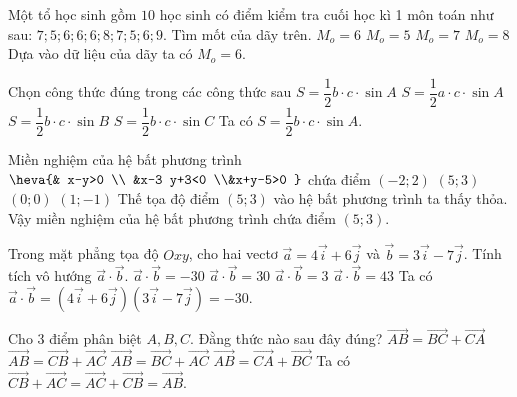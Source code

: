 \begin{ex}%
    Một tổ học sinh gồm $10$ học sinh có điểm kiểm tra cuối học kì 1 môn toán như sau: $7 ; 5 ; 6 ; 6 ; 6 ; 8 ; 7 ; 5 ; 6 ; 9$. Tìm mốt của dãy trên.
    \choice
     {\True $M_o=6$}
    {$M_o=5$}
    {$M_o=7$}
    {$M_o=8$}
    \loigiai
    {
        Dựa vào dữ liệu của dãy ta có $M_o=6$.
    }
\end{ex}

\begin{ex}%
    Chọn công thức đúng trong các công thức sau
    \choice
    {\True $S=\dfrac{1}{2}b\cdot c \cdot\sin A$}
    {$S=\dfrac{1}{2} a\cdot c \cdot\sin A$}
    {$S=\dfrac{1}{2} b\cdot c\cdot \sin B$}
    {$S=\dfrac{1}{2} b \cdot c \cdot \sin C$}
    \loigiai
    {
        Ta có $S=\dfrac{1}{2}b\cdot c \cdot\sin A$.
    }
\end{ex}
 
\begin{ex}%
    Miền nghiệm của hệ bất phương trình $\heva{& x-y>0  \\ &x-3 y+3<0 \\&x+y-5>0 }$ chứa điểm
    \choice
   {$(-2 ; 2)$}
  {\True $(5 ; 3)$}
 {$(0 ; 0)$}
  {$(1 ;-1)$}
    \loigiai
    {
        Thế tọa độ điểm $(5 ; 3)$ vào hệ bất phương trình ta thấy thỏa.\\
        Vậy miền nghiệm của hệ bất phương trình chứa điểm $(5 ; 3)$.
    }
\end{ex}

\begin{ex}%
    Trong mặt phẳng tọa độ $O x y$, cho hai vectơ $\vec{a}=4 \vec{i}+6 \vec{j}$ và $\vec{b}=3 \vec{i}-7 \vec{j}$. Tính tích vô hướng $\vec{a}\cdot \vec{b}$.
    \choice
   {\True $\vec{a}\cdot \vec{b}=-30$}
  {$\vec{a} \cdot \vec{b}=30$}
  {$\vec{a} \cdot \vec{b}=3$}
  {$\vec{a} \cdot \vec{b}=43$}
    \loigiai
    {
        Ta có $\vec{a}\cdot \vec{b}=\left(4 \vec{i}+6 \vec{j}\right)\left(3 \vec{i}-7 \vec{j}\right)=-30$.
    }
\end{ex}

 \begin{ex}%
     Cho 3 điểm phân biệt $A, B, C$. Đằng thức nào sau đây đúng?
     \choice
    { $\overrightarrow{A B}=\overrightarrow{B C}+\overrightarrow{C A}$}
     {\True $\overrightarrow{A B}=\overrightarrow{C B}+\overrightarrow{A C}$}
     {$\overrightarrow{A B}=\overrightarrow{B C}+\overrightarrow{A C}$}
     {$\overrightarrow{A B}=\overrightarrow{C A}+\overrightarrow{B C}$}
     \loigiai
     {
         Ta có $\overrightarrow{C B}+\overrightarrow{A C}=\overrightarrow{A C}+\overrightarrow{C B}=\overrightarrow{A B}$.
     }
 \end{ex}
 
